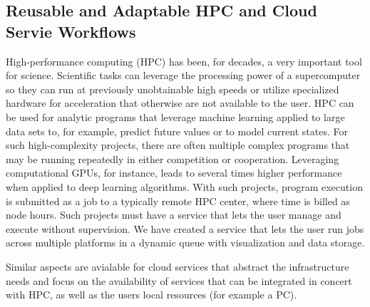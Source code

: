 \subsection{Reusable and Adaptable HPC and Cloud Servie Workflows}

High-performance computing (HPC) has been, for decades, a very important tool
for science. Scientific tasks can leverage the processing power of
a supercomputer so they can run at previously unobtainable high speeds
or utilize specialized hardware for acceleration that otherwise are not
available to the user. HPC can be used for analytic programs that
leverage machine learning applied to large data sets to, for example,
predict future values or to model current states. For such
high-complexity projects, there are often multiple complex programs that
may be running repeatedly in either competition or cooperation.
Leveraging computational GPUs, for instance, leads to several times higher
performance when applied to deep learning algorithms. With such
projects, program execution is submitted as a job to a typically remote
HPC center, where time is billed as node hours. Such projects must have
a service that lets the user manage and execute without supervision. We
have created a service that lets the user run jobs across multiple
platforms in a dynamic queue with visualization and data storage.

Similar aspects are avialable for cloud services that abstract the infrastructure needs and focus on the availability of services that can be integrated in concert with HPC, as well as the users local resources (for example a PC).



